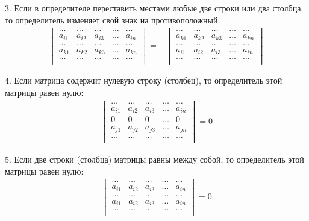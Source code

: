 \documentclass[a4paper,12pt,oneside]{extbook}
\theoremstyle{numbered}
\theoremstyle{unnumbered}
\theoremstyle{named}
\theoremstyle{unnumbered}
\theoremstyle{named}
\theoremstyle{named}
\theoremstyle{named}
\begin{document}
3. Если в определителе переставить местами любые две строки или два столбца, то определитель изменяет свой знак на противоположный:
\begin{gather*}
    \begin{vmatrix}
        \dots  & \dots  & \dots  & \dots & \dots  \\
        a_{i1} & a_{i2} & a_{i3} & \dots & a_{in} \\
        \dots  & \dots  & \dots  & \dots & \dots  \\
        a_{k1} & a_{k2} & a_{k3} & \dots & a_{kn} \\
        \dots  & \dots  & \dots  & \dots & \dots  \\
    \end{vmatrix}
    =
    -
    \begin{vmatrix}
        \dots  & \dots  & \dots  & \dots & \dots  \\
        a_{k1} & a_{k2} & a_{k3} & \dots & a_{kn} \\
        \dots  & \dots  & \dots  & \dots & \dots  \\
        a_{i1} & a_{i2} & a_{i3} & \dots & a_{in} \\
        \dots  & \dots  & \dots  & \dots & \dots  \\
    \end{vmatrix}
\end{gather*}

4. Если матрица содержит нулевую строку (столбец), то определитель этой матрицы равен нулю:
\begin{gather*}
    \begin{vmatrix}
        \dots  & \dots  & \dots  & \dots & \dots  \\
        a_{i1} & a_{i2} & a_{i3} & \dots & a_{in} \\
        0      & 0      & 0      & \dots & 0      \\
        a_{j1} & a_{j2} & a_{j3} & \dots & a_{jn} \\
        \dots  & \dots  & \dots  & \dots & \dots  \\
    \end{vmatrix}
    = 0
\end{gather*}

5. Если две строки (столбца) матрицы равны между собой, то определитель этой матрицы равен нулю:
\begin{gather*}
    \begin{vmatrix}
        \dots  & \dots  & \dots  & \dots & \dots  \\
        a_{i1} & a_{i2} & a_{i3} & \dots & a_{in} \\
        \dots  & \dots  & \dots  & \dots & \dots  \\
        a_{i1} & a_{i2} & a_{i3} & \dots & a_{in} \\
        \dots  & \dots  & \dots  & \dots & \dots  \\
    \end{vmatrix}
    = 0
\end{gather*}
\end{document}
